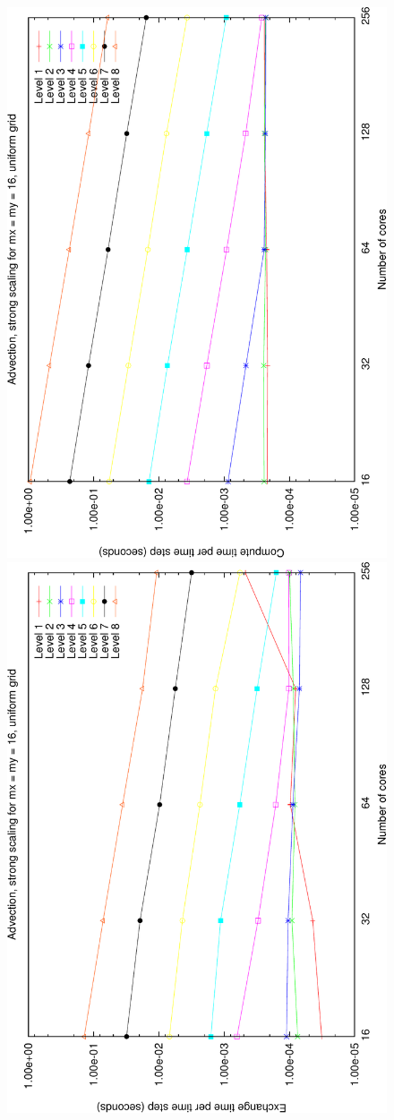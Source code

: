 \documentclass{IOS-Book-Article}     %
\begin{document}
\begin{figure}
\begin{center}
  \includegraphics[angle=-90,width=.8\columnwidth]{pdf/uni_advance_strong-crop}
  \\[1ex]
  \includegraphics[angle=-90,width=.8\columnwidth]{pdf/uni_exchange_strong-crop}

\end{center}
\end{figure}
\end{document}
